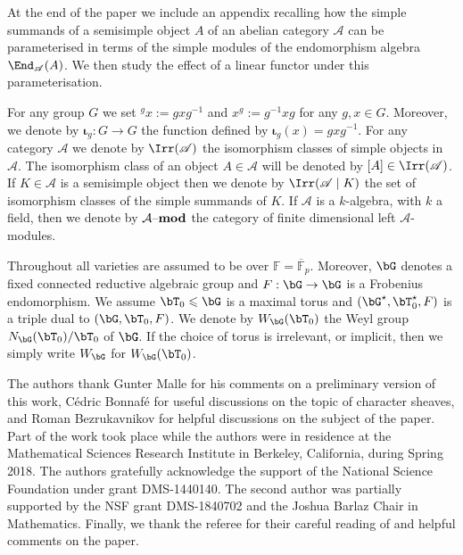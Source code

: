 \documentclass[eqthmnum,nocolour,skinny]{jt-calcs}
\newcommand{\lmod}[1]{\ensuremath{#1\text{--{\bf mod}}}}
\begin{document}
\begin{pa}
At the end of the paper we include an appendix recalling how the simple summands of a semisimple object $A$ of an abelian category $\mathscr{A}$ can be parameterised in terms of the simple modules of the endomorphism algebra $\End_{\mathscr{A}}(A)$. We then study the effect of a linear functor under this parameterisation.
\end{pa}

\begin{pa}[Notation]\label{pa:notation}
For any group $G$ we set ${}^gx := gxg^{-1}$ and $x^g := g^{-1}xg$ for any $g,x \in G$. Moreover, we denote by $\boldsymbol{\iota}_g : G \to G$ the function defined by $\boldsymbol{\iota}_g(x) = gxg^{-1}$. For any category $\mathscr{A}$ we denote by $\Irr(\mathscr{A})$ the isomorphism classes of simple objects in $\mathscr{A}$. The isomorphism class of an object $A \in \mathscr{A}$ will be denoted by $[A] \in \Irr(\mathscr{A})$. If $K \in \mathscr{A}$ is a semisimple object then we denote by $\Irr(\mathscr{A} \mid K)$ the set of isomorphism classes of the simple summands of $K$. If $\mathcal{A}$ is a $k$-algebra, with $k$ a field, then we denote by $\lmod{\mathcal{A}}$ the category of finite dimensional left $\mathcal{A}$-modules.

Throughout all varieties are assumed to be over $\mathbb{F} = \overline{\mathbb{F}}_p$. Moreover, $\bG$ denotes a fixed connected reductive algebraic group and $F : \bG \to \bG$ is a Frobenius endomorphism. We assume $\bT_0 \leqslant \bG$ is a maximal torus and $(\bG^{\star},\bT_0^{\star},F)$ is a triple dual to $(\bG,\bT_0,F)$. We denote by $W_{\bG}(\bT_0)$ the Weyl group $N_{\bG}(\bT_0)/\bT_0$ of $\bG$. If the choice of torus is irrelevant, or implicit, then we simply write $W_{\bG}$ for $W_{\bG}(\bT_0)$.
\end{pa}

\begin{acknowledgments}
The authors thank Gunter Malle for his comments on a preliminary version of this work, C\'edric Bonnaf\'e for useful discussions on the topic of character sheaves, and Roman Bezrukavnikov for helpful discussions on the subject of the paper. Part of the work took place while the authors were in residence at the Mathematical Sciences Research Institute in Berkeley, California, during Spring 2018. The authors gratefully acknowledge the support of the National Science Foundation under grant DMS-1440140. The second author was partially supported by the NSF grant DMS-1840702 and the Joshua Barlaz Chair in Mathematics. Finally, we thank the referee for their careful reading of and 
helpful comments on the paper.
\end{acknowledgments}
\end{document}
